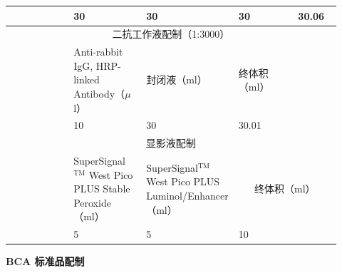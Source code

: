 \documentclass[UTF8,10pt,a4paper,fontset=fandol]{ctexart}
\newcommand{\fieldvalue}[1]{#1}
\newcommand{\handwritten}[1]{#1}
\begin{document}
\begin{tabular}{|p{0.19\linewidth}|p{0.22\linewidth}|p{0.20\linewidth}|p{0.18\linewidth}|p{0.13\linewidth}|}
\hline
 &
\fieldvalue{\handwritten{30}} &
\fieldvalue{\handwritten{30}} &
\fieldvalue{\handwritten{30}} &
\fieldvalue{\handwritten{30.06}} \\
\hline
\multicolumn{5}{|c|}{二抗工作液配制（1:3000）} \\
\hline
 & Anti-rabbit IgG, HRP-linked Antibody（$\mu$l）
& 封闭液（ml） & 终体积（ml） & \\
\hline
 &
\fieldvalue{\handwritten{10}} &
\fieldvalue{\handwritten{30}} &
\fieldvalue{\handwritten{30.01}} & \\
\hline
\multicolumn{5}{|c|}{显影液配制} \\
\hline
 & SuperSignal$^{\mathrm{TM}}$ West Pico PLUS Stable Peroxide（ml）
& SuperSignal$^{\mathrm{TM}}$ West Pico PLUS Luminol/Enhancer（ml）
& \multicolumn{2}{c|}{终体积（ml）} \\
\hline
 &
\fieldvalue{\handwritten{5}} &
\fieldvalue{\handwritten{5}} &
\fieldvalue{\handwritten{10}} & \\
\hline
\end{tabular}

\vspace{0.4em}

\begin{center}
\textbf{BCA 标准品配制}
\end{center}
\end{document}
